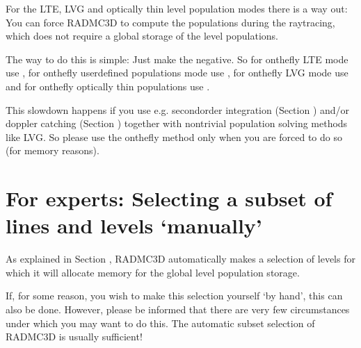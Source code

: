 \documentclass[letterpaper,10pt,english]{sphinxmanual}
\begin{document}
For the LTE, LVG and optically thin level population modes there is a way out:
You can force RADMC\sphinxhyphen{}3D to compute the populations  during the
ray\sphinxhyphen{}tracing, which does not require a global storage of the level populations.

The way to do this is simple: Just make the  negative. So for
on\sphinxhyphen{}the\sphinxhyphen{}fly LTE mode use , for on\sphinxhyphen{}the\sphinxhyphen{}fly user\sphinxhyphen{}defined
populations mode use , for on\sphinxhyphen{}the\sphinxhyphen{}fly LVG mode use
 and for on\sphinxhyphen{}the\sphinxhyphen{}fly optically thin populations use
.

 This slow\sphinxhyphen{}down happens if you use e.g.
second\sphinxhyphen{}order integration (Section {\hyperref[\detokenize{imagesspectra:sec-second-order}]{}}) and/or doppler
catching (Section {\hyperref[\detokenize{lineradtrans:sec-doppler-catching}]{}}) together with non\sphinxhyphen{}trivial
population solving methods like LVG. So please use the on\sphinxhyphen{}the\sphinxhyphen{}fly method only
when you are forced to do so (for memory reasons).


\section{For experts: Selecting a subset of lines and levels ‘manually’}
\label{\detokenize{lineradtrans:for-experts-selecting-a-subset-of-lines-and-levels-manually}}\label{\detokenize{lineradtrans:sec-line-selection}}
As explained in Section {\hyperref[\detokenize{lineradtrans:sec-calcstore-levpop}]{}}, RADMC\sphinxhyphen{}3D automatically
makes a selection of levels for which it will allocate memory for the global
level population storage.

If, for some reason, you wish to make this selection yourself ‘by hand’, this
can also be done. However, please be informed that there are very few
circumstances under which you may want to do this. The automatic subset
selection of RADMC\sphinxhyphen{}3D is usually sufficient!
\end{document}
